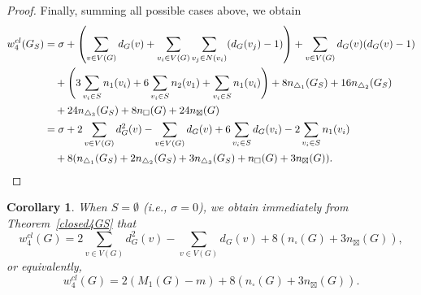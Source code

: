 \documentclass[12pt,a4paper,reqno]{amsart}
\numberwithin{equation}{section}
\theoremstyle{plain}
\newtheorem{corollary}[theorem]{Corollary}
\theoremstyle{definition}
\newcommand{\<}{\langle}
\renewcommand{\>}{\rangle}
\begin{document}
\begin{proof}
Finally, summing all possible cases above, we obtain
\begin{align*}
w_4^{cl}(G_S) 
&= \sigma + \left(\sum_{v \in V(G)} d_G(v) + \sum_{v_i \in V(G)} \sum_{v_j \in N(v_i)} (d_G(v_j)-1)\right) + \sum_{v \in V(G)} d_G(v)(d_G(v)-1)  \nonumber\\
&\quad+ \left(3\sum_{v_i \in S} n_1(v_i)  + 6 \sum_{v_i \in S} n_2(v_1) + \sum_{v_i \in S} n_1(v_i) \right) + 8n_{\triangle_1}(G_S) + 16n_{\triangle_2}(G_S) \\
&\quad+ 24n_{\triangle_3}(G_S) 
+ 8n_\square(G) + 24n_\boxtimes(G) \\
&= \sigma + 2\sum_{v\in V(G)} d^2_G(v) - \sum_{v \in V(G)}d_G(v) + 6 \sum_{v_i \in S} d_G(v_i) - 2 \sum_{v_i \in S} n_1(v_i ) \\
&\quad+   8 (n_{\triangle_1}(G_S) + 2 n_{\triangle_2}(G_S) + 3 n_{\triangle_3}(G_S) + n_\square(G) + 3n_\boxtimes(G)). \qedhere
\end{align*}
\end{proof}

\begin{corollary}
\label{closed4G}
When $S=\emptyset$ (i.e., $\sigma=0$), we obtain immediately from Theorem~\ref{closed4GS} that 
\[
w^{cl}_4(G) = 2 \sum_{v \in V(G)} d^2_G(v) - \sum_{v \in V(G)} d_G(v) + 8(n_\square(G) + 3n_\boxtimes(G)),
\]
or equivalently,
\begin{equation}
\label{eq:closed4G}
w^{cl}_4(G) = 2 \left(M_1(G)-m\right) + 8(n_\square(G) + 3n_\boxtimes(G)).
\end{equation}
\end{corollary}
\end{document}
